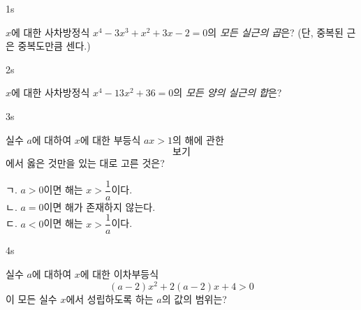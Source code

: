 \documentclass[10pt]{article}
\begin{document}


\begin{pagepair}

\begin{problem}{1}{s}
\par\smallskip
$x$에 대한 사차방정식 $x^4 - 3x^3 + x^2 + 3x - 2 = 0$의 \emph{모든 실근의 곱}은? (단, 중복된 근은 중복도만큼 센다.)
\begin{choices}
\end{choices}
\end{problem}

\begin{problem}{2}{s}
\par\smallskip
$x$에 대한 사차방정식 $x^4 - 13x^2 + 36 = 0$의 \emph{모든 양의 실근의 합}은?
\begin{choices}
\end{choices}
\end{problem}

\end{pagepair}

\begin{pagepair}

\begin{problem}{3}{s}
\par\smallskip
실수 $a$에 대하여 $x$에 대한 부등식 $ax > 1$의 해에 관한 \[보기\]에서 옳은 것만을 있는 대로 고른 것은?
\begin{conditions}
\setlength{\baselineskip}{1.4\baselineskip}
ㄱ. $a > 0$이면 해는 $x > \dfrac{1}{a}$이다. \\[6pt]
ㄴ. $a = 0$이면 해가 존재하지 않는다. \\[6pt]
ㄷ. $a < 0$이면 해는 $x > \dfrac{1}{a}$이다.
\end{conditions}
\begin{choices}
\end{choices}
\end{problem}

\begin{problem}{4}{s}
\par\smallskip
실수 $a$에 대하여 $x$에 대한 이차부등식
$$(a - 2)x^2 + 2(a - 2)x + 4 > 0$$
이 모든 실수 $x$에서 성립하도록 하는 $a$의 값의 범위는?
\begin{choices}
\end{choices}
\end{problem}

\end{pagepair}
\end{document}
